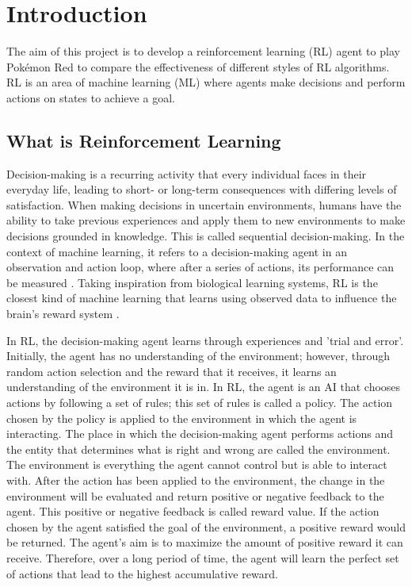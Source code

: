 \section{Introduction}
The aim of this project is to develop a reinforcement learning (RL) agent to play Pokémon Red to compare
the effectiveness of different styles of RL algorithms. RL is an area of machine learning (ML) where
agents make decisions and perform actions on states to achieve a goal.


\subsection{What is Reinforcement Learning}

Decision-making is a recurring activity that every individual faces in their everyday life, leading to short- or long-term consequences with differing levels of satisfaction. When making decisions in uncertain environments, humans have the ability to take previous experiences and apply them to new environments to make decisions grounded in knowledge. This is called sequential decision-making. In the context of machine learning, it refers to a decision-making agent in an observation and action loop, where after a series of actions, its performance can be measured \cite{francon2020effective}. Taking inspiration from biological learning systems, RL is the closest kind of machine learning that learns using observed data to influence the brain's reward system \cite{Sutton1}. 

In RL, the decision-making agent learns through experiences and 'trial and error'. Initially, the agent has no understanding of the environment; however, through random action selection and the reward that it receives, it learns an understanding of the environment it is in. In RL, the agent is an AI that chooses actions by following a set of rules; this set of rules is called a policy. The action chosen by the policy is applied to the environment in which the agent is interacting. The place in which the decision-making agent performs actions and the entity that determines what is right and wrong are called the environment. The environment is everything the agent cannot control but is able to interact with. After the action has been applied to the environment, the change in the environment will be evaluated and return positive or negative feedback to the agent. This positive or negative feedback is called reward value. If the action chosen by the agent satisfied the goal of the environment, a positive reward would be returned. The agent’s aim is to maximize the amount of positive reward it can receive. Therefore, over a long period of time, the agent will learn the perfect set of actions that lead to the highest accumulative reward. 

